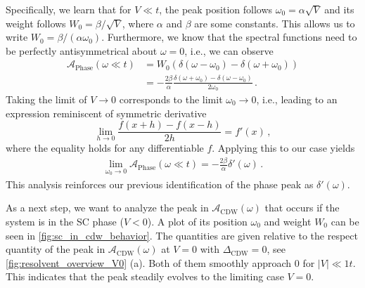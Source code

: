 \documentclass[
    reprint, 
    aps,
    preprintnumbers,
    twocolumn,
    prb,
    superscriptaddress
]{revtex4-2}
\newcommand{\spectral}[1]{\mathcal{A}_\text{#1}  (\omega)}
\begin{document}
Specifically, we learn that for $V \ll t$, the peak position follows $\omega_0 = \alpha \sqrt{V}$ and its weight follows $W_0 = \beta / \sqrt{V}$, 
where $\alpha$ and $\beta$ are some constants.
This allows us to write $W_0 = \beta / (\alpha \omega_0)$. 
Furthermore, we know that the spectral functions need to be perfectly antisymmetrical about $\omega = 0$, i.e., we can observe
\begin{align}
    \mathcal{A}_\text{Phase} (\omega \ll t) &= W_0 (\delta (\omega - \omega_0) - \delta (\omega + \omega_0)) \nonumber \\
        &= - \frac{2\beta}{\alpha} \frac{\delta (\omega + \omega_0) - \delta (\omega - \omega_0)}{2\omega_0} \,.
\end{align} 
Taking the limit of $V \to 0$ corresponds to the limit $\omega_0 \to 0$, i.e., leading to an expression reminiscent of symmetric derivative
\begin{equation}
    \lim_{h \to 0} \frac{f(x + h) - f(x - h)}{2h} = f'(x)\,,
\end{equation}
where the equality holds for any differentiable $f$.
Applying this to our case yields
\begin{align}
    \lim_{\omega_0 \to 0} \mathcal{A}_\text{Phase} (\omega \ll t) = - \frac{2 \beta}{\alpha} \delta'(\omega)\,.
\end{align}
This analysis reinforces our previous identification of the phase peak as $\delta' (\omega)$.


As a next step, we want to analyze the peak in $\spectral{CDW}$ that occurs if the system is in the SC phase ($V<0$).
A plot of its position $\omega_0$ and weight $W_0$ can be seen in \autoref{fig:sc_in_cdw_behavior}.
The quantities are given relative to the respect quantity of the peak in $\spectral{CDW}$ at $V=0$ with $\Delta_\text{CDW} = 0$, see \autoref{fig:resolvent_overview_V0} (a).
Both of them smoothly approach $0$ for $|V| \ll 1t$.
This indicates that the peak steadily evolves to the limiting case $V=0$.
\end{document}
